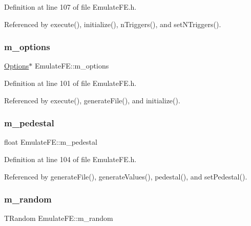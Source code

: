 Definition at line 107 of file Emulate\+F\+E.\+h.



Referenced by execute(), initialize(), n\+Triggers(), and set\+N\+Triggers().

\mbox{\label{classEmulateFE_a2f2da7d4b2164c47673a6ecc6dcef1ea}} 
\subsubsection{\texorpdfstring{m\+\_\+options}{m\_options}}
{\footnotesize\ttfamily \hyperlink{classOptions}{Options}$\ast$ Emulate\+F\+E\+::m\+\_\+options\hspace{0.3cm}{\ttfamily [private]}}



Definition at line 101 of file Emulate\+F\+E.\+h.



Referenced by execute(), generate\+File(), and initialize().

\mbox{\label{classEmulateFE_a033996ce759c11305395ac865a6c074a}} 
\subsubsection{\texorpdfstring{m\+\_\+pedestal}{m\_pedestal}}
{\footnotesize\ttfamily float Emulate\+F\+E\+::m\+\_\+pedestal\hspace{0.3cm}{\ttfamily [private]}}



Definition at line 104 of file Emulate\+F\+E.\+h.



Referenced by generate\+File(), generate\+Values(), pedestal(), and set\+Pedestal().

\mbox{\label{classEmulateFE_a7f883bc6fb5bde2c98e464ef74e5c643}} 
\subsubsection{\texorpdfstring{m\+\_\+random}{m\_random}}
{\footnotesize\ttfamily T\+Random Emulate\+F\+E\+::m\+\_\+random\hspace{0.3cm}{\ttfamily [private]}}



